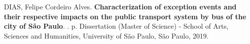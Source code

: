 \documentclass[
	12pt,				%
	oneside,			%
	a4paper,			%
	english,			%
	brazil				%
	]{abntex2ppgsi}
\begin{document}
% 
% 
\begin{resumo}[Abstract]

% 
%
%
%
\begin{flushleft}
DIAS, Felipe Cordeiro Alves. \textbf{Characterization of exception events and their respective impacts on the public transport system by bus of the city of São Paulo}. \imprimirdata. \pageref{LastPage} p. Dissertation (Master of Science) - School of Arts, Sciences and Humanities, University of São Paulo, São Paulo, 2019. 
\end{flushleft}


\end{resumo}
\end{document}
